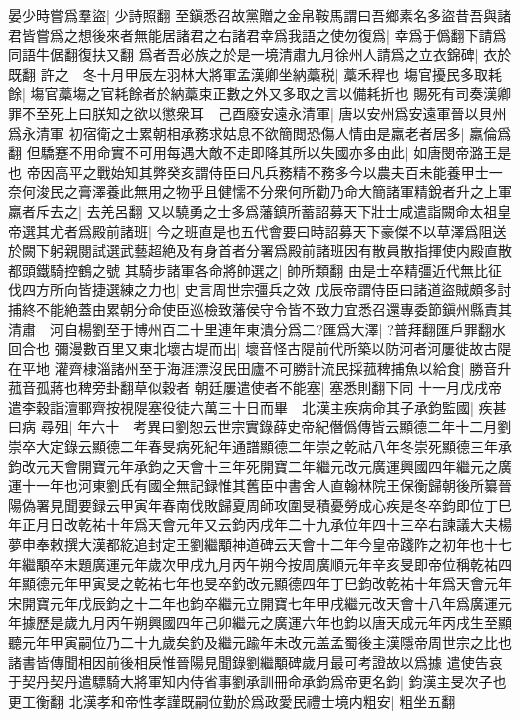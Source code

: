 晏少時嘗爲羣盜|{
	少詩照翻}
至鎭悉召故黨贈之金帛鞍馬謂曰吾鄉素名多盜昔吾與諸君皆嘗爲之想後來者無能居諸君之右諸君幸爲我語之使勿復爲|{
	幸爲于僞翻下請爲同語牛倨翻復扶又翻}
爲者吾必族之於是一境清肅九月徐州人請爲之立衣錦碑|{
	衣於既翻}
許之　冬十月甲辰左羽林大將軍孟漢卿坐納藁税|{
	藁禾稈也}
塲官擾民多取耗餘|{
	塲官藁塲之官耗餘者於納藁束正數之外又多取之言以備耗折也}
賜死有司奏漢卿罪不至死上曰朕知之欲以懲衆耳　己酉廢安遠永清軍|{
	唐以安州爲安遠軍晉以貝州爲永清軍}
初宿衛之士累朝相承務求姑息不欲簡閲恐傷人情由是羸老者居多|{
	羸倫爲翻}
但驕蹇不用命實不可用每遇大敵不走即降其所以失國亦多由此|{
	如唐閔帝潞王是也}
帝因高平之戰始知其弊癸亥謂侍臣曰凡兵務精不務多今以農夫百未能養甲士一奈何浚民之膏澤養此無用之物乎且健懦不分衆何所勸乃命大簡諸軍精銳者升之上軍羸者斥去之|{
	去羌呂翻}
又以驍勇之士多爲藩鎮所蓄詔募天下壯士咸遣詣闕命太祖皇帝選其尤者爲殿前諸班|{
	今之班直是也五代會要曰時詔募天下豪傑不以草澤爲阻送於闕下躬親閱試選武藝超絶及有身首者分署爲殿前諸班因有散員散指揮使内殿直散都頭鐵騎控鶴之號}
其騎步諸軍各命將帥選之|{
	帥所類翻}
由是士卒精彊近代無比征伐四方所向皆捷選練之力也|{
	史言周世宗彊兵之效}
戊辰帝謂侍臣曰諸道盜賊頗多討捕終不能絶蓋由累朝分命使臣巡檢致藩侯守令皆不致力宜悉召還專委節鎭州縣責其清肅　河自楊劉至于博州百二十里連年東潰分爲二?匯爲大澤|{
	?普拜翻匯戶罪翻水回合也}
彌漫數百里又東北壞古堤而出|{
	壞音怪古隄前代所築以防河者河屢徙故古隄在平地}
灌齊棣淄諸州至于海涯漂沒民田廬不可勝計流民採菰稗捕魚以給食|{
	勝音升菰音孤蔣也稗旁卦翻草似穀者}
朝廷屢遣使者不能塞|{
	塞悉則翻下同}
十一月戊戌帝遣李穀詣澶鄆齊按視隄塞役徒六萬三十日而畢　北漢主疾病命其子承鈞監國|{
	疾甚曰病}
尋殂|{
	年六十　考異曰劉恕云世宗實錄薛史帝紀僭僞傳皆云顯德二年十二月劉崇卒大定錄云顯德二年春旻病死紀年通譜顯德二年崇之乾祜八年冬崇死顯德三年承鈞改元天會開寶元年承鈞之天會十三年死開寶二年繼元改元廣運興國四年繼元之廣運十一年也河東劉氏有國全無記録惟其舊臣中書舍人直翰林院王保衡歸朝後所纂晉陽偽署見聞要録云甲寅年春南伐敗歸夏周師攻圍旻積憂勞成心疾是冬卒鈞即位丁巳年正月日改乾祐十年爲天會元年又云鈞丙戌年二十九承位年四十三卒右諫議大夫楊夢申奉敕撰大漢都紇追封定王劉繼顒神道碑云天會十二年今皇帝踐阼之初年也十七年繼顒卒末題廣運元年歲次甲戌九月丙午朔今按周廣順元年辛亥旻即帝位稱乾祐四年顯德元年甲寅旻之乾祐七年也旻卒釣改元顯德四年丁巳鈞改乾祐十年爲天會元年宋開寶元年戊辰鈞之十二年也鈞卒繼元立開寶七年甲戌繼元改天會十八年爲廣運元年據歷是歲九月丙午朔興國四年己卯繼元之廣運六年也鈞以唐天成元年丙戌生至顯聽元年甲寅嗣位乃二十九歲矣釣及繼元踰年未改元盖孟蜀後主漢隱帝周世宗之比也諸書皆傳聞相因前後相戾惟晉陽見聞錄劉繼顒碑歲月最可考證故以爲據}
遣使告哀于契丹契丹遣驃騎大將軍知内侍省事劉承訓冊命承鈞爲帝更名鈞|{
	鈞漢主旻次子也更工衡翻}
北漢孝和帝性孝謹既嗣位勤於爲政愛民禮士境内粗安|{
	粗坐五翻}
